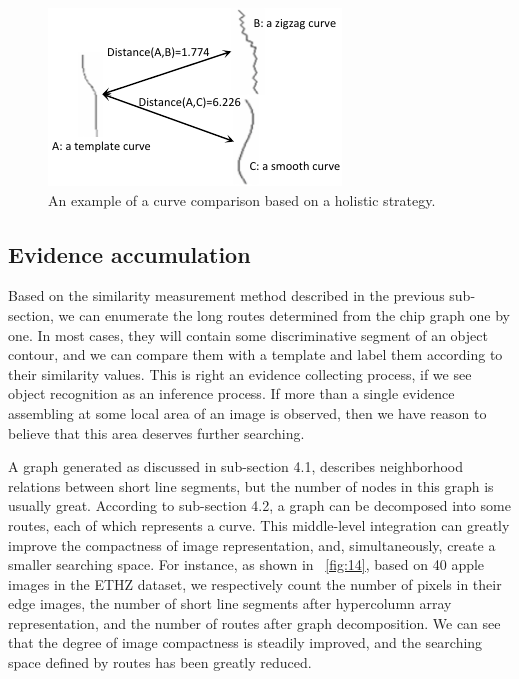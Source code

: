 \documentclass[journal]{IEEEtran}
\begin{document}
\begin{figure}[!t]
\centering
\includegraphics[width=0.6\linewidth]{images/fig13.pdf}
\caption{An example of a curve comparison based on a holistic strategy.}
\label{fig:13}
\end{figure}

\subsection{Evidence accumulation}

Based on the similarity measurement method described in the previous sub-section, 
we can enumerate the long routes determined from the chip graph one by one. 
In most cases, they will contain some discriminative segment of an object contour, 
and we can compare them with a template and label them according to their similarity values. 
This is right an evidence collecting process, 
if we see object recognition as an inference process. 
If more than a single evidence assembling at some local area of an image is observed, 
then we have reason to believe that this area deserves further searching.

A graph generated as discussed in sub-section 4.1, 
describes neighborhood relations between short line segments, 
but the number of nodes in this graph is usually great. 
According to sub-section 4.2, a graph can be decomposed into some routes, each of which represents a curve. 
This middle-level integration can greatly improve the compactness of image representation, 
and, simultaneously, create a smaller searching space. 
For instance, as shown in \figurename~\ref{fig:14}, based on 40 apple images in the ETHZ dataset, 
we respectively count the number of pixels in their edge images, the number of short line segments after hypercolumn array representation, and the number of routes after graph decomposition. 
We can see that the degree of image compactness is steadily improved, and the searching space defined by routes has been greatly reduced.
\end{document}
